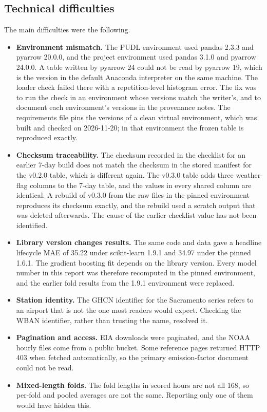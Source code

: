 \documentclass[10pt,journal,compsoc]{IEEEtran}
\begin{document}
\subsection{Technical difficulties}
The main difficulties were the following.
\begin{itemize}
\item \textbf{Environment mismatch.} The PUDL environment used pandas 2.3.3 and pyarrow 20.0.0, and the project environment used pandas 3.1.0 and pyarrow 24.0.0. A table written by pyarrow 24 could not be read by pyarrow 19, which is the version in the default Anaconda interpreter on the same machine. The loader check failed there with a repetition-level histogram error. The fix was to run the check in an environment whose versions match the writer's, and to document each environment's versions in the provenance notes. The requirements file pins the versions of a clean virtual environment, which was built and checked on 2026-11-20; in that environment the frozen table is reproduced exactly.
\item \textbf{Checksum traceability.} The checksum recorded in the checklist for an earlier 7-day build does not match the checksum in the stored manifest for the v0.2.0 table, which is different again. The v0.3.0 table adds three weather-flag columns to the 7-day table, and the values in every shared column are identical. A rebuild of v0.3.0 from the raw files in the pinned environment reproduces its checksum exactly, and the rebuild used a scratch output that was deleted afterwards. The cause of the earlier checklist value has not been identified.
\item \textbf{Library version changes results.} The same code and data gave a headline lifecycle MAE of 35.22 under scikit-learn 1.9.1 and 34.97 under the pinned 1.6.1. The gradient boosting fit depends on the library version. Every model number in this report was therefore recomputed in the pinned environment, and the earlier fold results from the 1.9.1 environment were replaced.
\item \textbf{Station identity.} The GHCN identifier for the Sacramento series refers to an airport that is not the one most readers would expect. Checking the WBAN identifier, rather than trusting the name, resolved it.
\item \textbf{Pagination and access.} EIA downloads were paginated, and the NOAA hourly files come from a public bucket. Some reference pages returned HTTP 403 when fetched automatically, so the primary emission-factor document could not be read.
\item \textbf{Mixed-length folds.} The fold lengths in scored hours are not all 168, so per-fold and pooled averages are not the same. Reporting only one of them would have hidden this.
\end{itemize}
\end{document}

